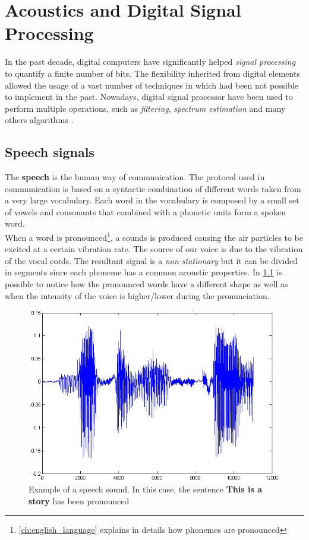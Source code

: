\chapter{Acoustics and Digital Signal Processing}
\label{ch:speech analysis}
In the past decade, digital computers have significantly helped \textit{signal processing} to quantify a finite number of bits. The flexibility inherited from digital elements allowed the usage of a vast number of techniques in which had been not possible to implement in the past. Nowadays, digital signal processor have been used to perform multiple operations, such as \textit{filtering}, \textit{spectrum estimation} and many others algorithms \cite{orfanidis1995introduction}.


\section{Speech signals}
\label{sec:speech_signals}
The \textbf{speech} is the human way of communication. The protocol used in communication is based on a syntactic combination of different words taken from a very large vocabulary. Each word in the vocabulary is composed by a small set of vowels and consonants that combined with a phonetic units form a spoken word. \\
\noindent When a word is pronounced\footnote{\ref{ch:english_language} explains in details how phonemes are pronounced}, a sounds is produced causing the air particles to be excited at a certain vibration rate. The source of our voice is due to the vibration of the vocal cords. The resultant signal is a \textit{non-stationary} but it can be divided in segments since each phoneme has a common acoustic properties. In \ref{fig:ex_sound_wave} is possible to notice how the pronounced words have a different shape as well as when the intensity of the voice is higher/lower during the pronunciation.
 
\begin{figure}[!ht]
	\centering
	\includegraphics[scale=0.4]{Figures/ex_speech.png}
	\caption{Example of a speech sound. In this case, the sentence \textbf{This is a story} has been pronounced \cite{ex_speech_image}}
	\label{fig:ex_sound_wave}
\end{figure}

